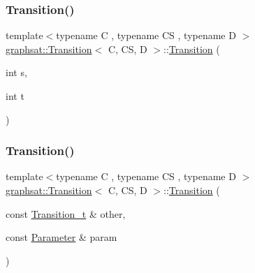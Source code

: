 \subsubsection{\texorpdfstring{Transition()}{Transition()}\hspace{0.1cm}{\footnotesize\ttfamily [2/3]}}
{\footnotesize\ttfamily template$<$typename C , typename CS , typename D $>$ \\
\mbox{\hyperlink{classgraphsat_1_1_transition}{graphsat\+::\+Transition}}$<$ C, CS, D $>$\+::\mbox{\hyperlink{classgraphsat_1_1_transition}{Transition}} (\begin{DoxyParamCaption}\item[{int}]{s,  }\item[{int}]{t }\end{DoxyParamCaption})\hspace{0.3cm}{\ttfamily [inline]}}

\mbox{\label{classgraphsat_1_1_transition_a6324e36409a36829cdc25b53c5ee332d}} 
\subsubsection{\texorpdfstring{Transition()}{Transition()}\hspace{0.1cm}{\footnotesize\ttfamily [3/3]}}
{\footnotesize\ttfamily template$<$typename C , typename CS , typename D $>$ \\
\mbox{\hyperlink{classgraphsat_1_1_transition}{graphsat\+::\+Transition}}$<$ C, CS, D $>$\+::\mbox{\hyperlink{classgraphsat_1_1_transition}{Transition}} (\begin{DoxyParamCaption}\item[{const \mbox{\hyperlink{classgraphsat_1_1_transition_ae0650c39cf272493d16d1fd1b01b6075}{Transition\+\_\+t}} \&}]{other,  }\item[{const \mbox{\hyperlink{classgraphsat_1_1_parameter}{Parameter}} \&}]{param }\end{DoxyParamCaption})\hspace{0.3cm}{\ttfamily [inline]}}

